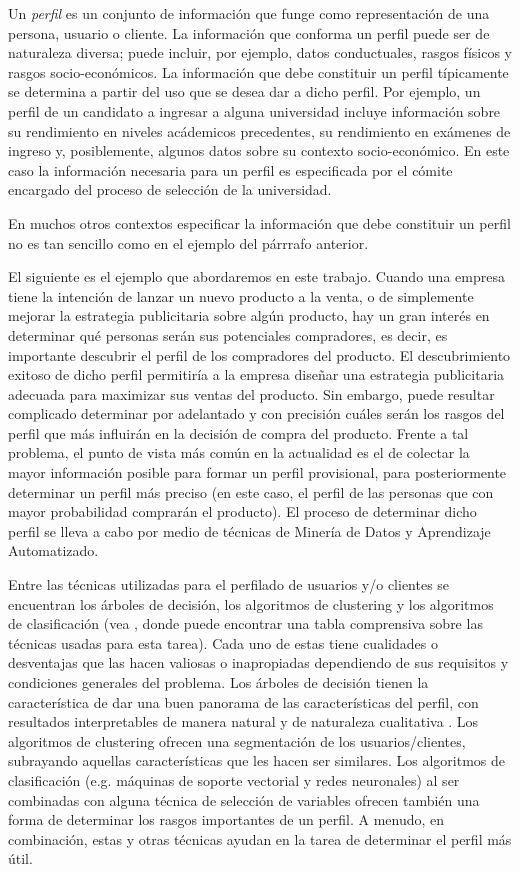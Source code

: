 \documentclass[letterpaper,11pt]{article}
\begin{document}
\begin{multicols}{2}
Un \emph{perfil} es un conjunto de información que funge como representación de una persona, usuario o cliente\cite{cufo}. La información que
conforma un perfil puede ser de naturaleza diversa; puede incluir, por ejemplo, datos conductuales, rasgos físicos y rasgos
socio-económicos. La información que debe constituir un perfil típicamente se determina a partir del uso que
se desea dar a dicho perfil. Por ejemplo, un perfil de un candidato a ingresar a alguna universidad
incluye información sobre su rendimiento en niveles acádemicos precedentes, su rendimiento en exámenes de ingreso y, 
posiblemente, algunos datos sobre su contexto socio-económico. En este caso la información necesaria para un perfil es
especificada por el cómite encargado del proceso de selección de la universidad. 

En muchos otros contextos especificar la información que debe constituir un perfil no es tan sencillo como en
el ejemplo del párrrafo anterior. 

El siguiente es el ejemplo que abordaremos en este trabajo. Cuando una empresa tiene la intención de lanzar un nuevo
producto a la venta, o de simplemente mejorar la estrategia publicitaria sobre algún producto, 
hay un gran interés en determinar qué personas serán sus potenciales compradores, es decir, es importante descubrir el perfil de los compradores 
del producto. El descubrimiento exitoso de dicho perfil permitiría a la empresa diseñar una estrategia publicitaria adecuada
para maximizar sus ventas del producto. Sin embargo, puede resultar
complicado determinar por adelantado y con precisión cuáles serán los rasgos del perfil que más influirán en la decisión
de compra del producto. Frente a tal problema, el punto de vista más común en la actualidad es el de colectar la mayor información posible para
formar un perfil provisional, para posteriormente determinar un perfil más
preciso (en este caso, el perfil de las personas que con mayor probabilidad comprarán el producto). El  proceso de
determinar dicho perfil se lleva a cabo por medio de técnicas de Minería de Datos y Aprendizaje Automatizado. 

Entre las técnicas utilizadas para el perfilado de usuarios y/o clientes se encuentran los árboles de decisión,
los algoritmos de clustering y los  algoritmos de clasificación (vea \cite{mah}, donde  puede encontrar una tabla
comprensiva sobre las técnicas usadas para esta tarea). Cada uno de estas tiene cualidades o desventajas que las hacen valiosas o
inapropiadas dependiendo de sus requisitos y condiciones generales del problema. Los árboles de decisión tienen la característica de 
dar una buen panorama de las características del perfil, con
resultados interpretables de manera natural y de naturaleza cualitativa \cite[Cap. 6]{berry}. Los algoritmos de clustering ofrecen
una segmentación de los usuarios/clientes, subrayando aquellas características que les hacen ser similares. Los algoritmos de clasificación 
(e.g. máquinas de soporte vectorial y redes neuronales) al ser combinadas con alguna técnica de selección de variables
ofrecen también una forma de determinar los rasgos importantes de un perfil. A menudo, en combinación, estas y otras
técnicas ayudan en la tarea de determinar el perfil más útil.


\end{multicols}
\end{document}
